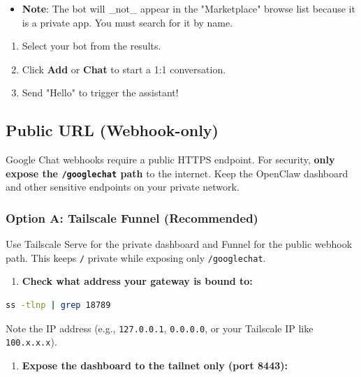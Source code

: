 \begin{itemize}
  \item \textbf{Note}: The bot will \_not\_ appear in the "Marketplace" browse list because it is a private app. You must search for it by name.
\end{itemize}

\begin{enumerate}
  \item Select your bot from the results.
  \item Click \textbf{Add} or \textbf{Chat} to start a 1:1 conversation.
  \item Send "Hello" to trigger the assistant!
\end{enumerate}


\subsection{Public URL (Webhook-only)}


Google Chat webhooks require a public HTTPS endpoint. For security, \textbf{only expose the \texttt{/googlechat} path} to the internet. Keep the OpenClaw dashboard and other sensitive endpoints on your private network.

\subsubsection{Option A: Tailscale Funnel (Recommended)}


Use Tailscale Serve for the private dashboard and Funnel for the public webhook path. This keeps \texttt{/} private while exposing only \texttt{/googlechat}.

\begin{enumerate}
  \item \textbf{Check what address your gateway is bound to:}
\end{enumerate}


\begin{lstlisting}[language=bash]
   ss -tlnp | grep 18789
\end{lstlisting}


Note the IP address (e.g., \texttt{127.0.0.1}, \texttt{0.0.0.0}, or your Tailscale IP like \texttt{100.x.x.x}).

\begin{enumerate}
  \item \textbf{Expose the dashboard to the tailnet only (port 8443):}
\end{enumerate}


